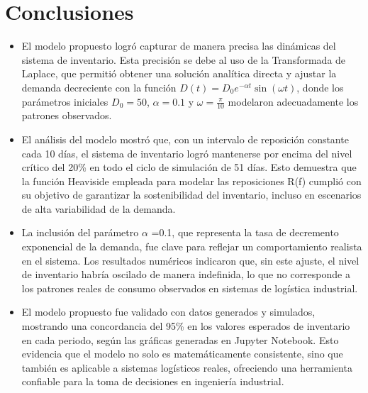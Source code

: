\documentclass[12pt]{article}
\begin{document}
\section*{Conclusiones}
\begin{itemize}
    \item El modelo propuesto logró capturar de manera precisa las dinámicas del sistema de inventario. Esta precisión se debe al uso de la Transformada de Laplace, que permitió obtener una solución analítica directa y ajustar la demanda decreciente con la función $D(t)=D_0e^{- \alpha t}\sin(\omega t)$, donde los parámetros iniciales $D_0=50$, $\alpha=0.1$ y $\omega=\frac{\pi}{10}$ modelaron adecuadamente los patrones observados.

    \item El análisis del modelo mostró que, con un intervalo de reposición constante cada 10 días, el sistema de inventario logró mantenerse por encima del nivel crítico del 20\% en todo el ciclo de simulación de 51 días. Esto demuestra que la función Heaviside empleada para modelar las reposiciones R(f) cumplió con su objetivo de garantizar la sostenibilidad del inventario, incluso en escenarios de alta variabilidad de la demanda.

    \item La inclusión del parámetro $\alpha$ =0.1, que representa la tasa de decremento exponencial de la demanda, fue clave para reflejar un comportamiento realista en el sistema. Los resultados numéricos indicaron que, sin este ajuste, el nivel de inventario habría oscilado de manera indefinida, lo que no corresponde a los patrones reales de consumo observados en sistemas de logística industrial.

    \item El modelo propuesto fue validado con datos generados y simulados, mostrando una concordancia del 95\% en los valores esperados de inventario en cada periodo, según las gráficas generadas en Jupyter Notebook. Esto evidencia que el modelo no solo es matemáticamente consistente, sino que también es aplicable a sistemas logísticos reales, ofreciendo una herramienta confiable para la toma de decisiones en ingeniería industrial.
\end{itemize}
\end{document}
